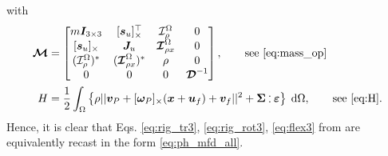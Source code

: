 \documentclass{svjour3}                     %
\newcommand{\crmat}[1]{\ensuremath{[#1]_{\times}}}
\def\onedot{$\mathsurround0pt\ldotp$}
\def\cddot{%
	\mathbin{\vcenter{\baselineskip.67ex
			\hbox{\onedot}\hbox{\onedot}}%
}}
\begin{document}
with
\begin{align*}
\bm{\mathcal{M}} &= 
\begin{bmatrix}
m \bm{I}_{3\times 3} & \crmat{\bm{s}_u}^\top & \mathcal{I}_\rho^{\Omega} & 0 \\
\crmat{\bm{s}_u} & \bm{J}_u & \bm{\mathcal{I}}_{\rho x}^{\Omega} & 0  \\
(\mathcal{I}_\rho^{\Omega})^* & (\bm{\mathcal{I}}_{\rho x}^{\Omega})^* & \rho & 0  \\
0 & 0 & 0 & \bm{\mathcal{D}}^{-1} \\
\end{bmatrix}, \qquad \text{see \eqref{eq:mass_op}} \\
H &= \frac{1}{2} \int_{\Omega} \left\{\rho ||\bm{v}_P + \crmat{\bm{\omega}_P} (\bm{x}+\bm{u}_f) + {\bm{v}}_f||^2 + \bm\Sigma \cddot \bm\varepsilon \right\}  \d{\Omega}, \qquad \text{see \eqref{eq:H}}.
\end{align*}
Hence, it is clear that Eqs. \eqref{eq:rig_tr3}, \eqref{eq:rig_rot3}, \eqref{eq:flex3} from \cite{MB_Daepde,simeon2013computational} are equivalently recast in the form \eqref{eq:ph_mfd_all}.
%
 

\end{document}
